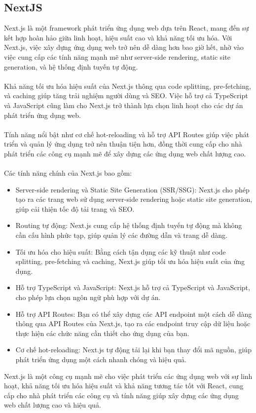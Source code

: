 \subsection{NextJS}
Next.js là một framework phát triển ứng dụng web dựa trên React, mang đến sự kết hợp hoàn hảo giữa linh hoạt, hiệu suất cao và khả năng tối ưu hóa. Với Next.js, việc xây dựng ứng dụng web trở nên dễ dàng hơn bao giờ hết, nhờ vào việc cung cấp các tính năng mạnh mẽ như server-side rendering, static site generation, và hệ thống định tuyến tự động.\\
\\
Khả năng tối ưu hóa hiệu suất của Next.js thông qua code splitting, pre-fetching, và caching giúp tăng trải nghiệm người dùng và SEO. Việc hỗ trợ cả TypeScript và JavaScript cũng làm cho Next.js trở thành lựa chọn linh hoạt cho các dự án phát triển ứng dụng web.\\
\\
Tính năng nổi bật như cơ chế hot-reloading và hỗ trợ API Routes giúp việc phát triển và quản lý ứng dụng trở nên thuận tiện hơn, đồng thời cung cấp cho nhà phát triển các công cụ mạnh mẽ để xây dựng các ứng dụng web chất lượng cao.\\
\\
Các tính năng chính của Next.js bao gồm:
\begin{itemize}
    \item Server-side rendering và Static Site Generation (SSR/SSG): Next.js cho phép tạo ra các trang web sử dụng server-side rendering hoặc static site generation, giúp cải thiện tốc độ tải trang và SEO.

    \item Routing tự động: Next.js cung cấp hệ thống định tuyến tự động mà không cần cấu hình phức tạp, giúp quản lý các đường dẫn và trang dễ dàng.

    \item Tối ưu hóa cho hiệu suất: Bằng cách tận dụng các kỹ thuật như code splitting, pre-fetching và caching, Next.js giúp tối ưu hóa hiệu suất của ứng dụng.

    \item Hỗ trợ TypeScript và JavaScript: Next.js hỗ trợ cả TypeScript và JavaScript, cho phép lựa chọn ngôn ngữ phù hợp với dự án.

    \item Hỗ trợ API Routes: Bạn có thể xây dựng các API endpoint một cách dễ dàng thông qua API Routes của Next.js, tạo ra các endpoint truy cập dữ liệu hoặc thực hiện các chức năng cần thiết cho ứng dụng của bạn.

    \item Cơ chế hot-reloading: Next.js tự động tải lại khi bạn thay đổi mã nguồn, giúp phát triển ứng dụng một cách nhanh chóng và hiệu quả.
\end{itemize}
Next.js là một công cụ mạnh mẽ cho việc phát triển các ứng dụng web với sự linh hoạt, khả năng tối ưu hóa hiệu suất và khả năng tương tác tốt với React, cung cấp cho nhà phát triển các công cụ và tính năng giúp xây dựng các ứng dụng web chất lượng cao và hiệu quả.
